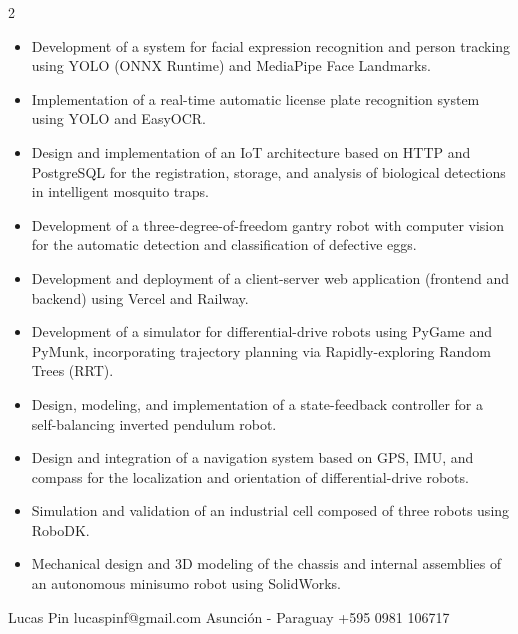 \documentclass[lighthipster]{simplehipstercv}
\newlength{\rightcolwidth}
\begin{document}
\begin{paracol}{2}
\begin{itemize}
\item Development of a system for facial expression recognition and person tracking using YOLO (ONNX Runtime) and MediaPipe Face Landmarks.

\item Implementation of a real-time automatic license plate recognition system using YOLO and EasyOCR.

\item Design and implementation of an IoT architecture based on HTTP and PostgreSQL for the registration, storage, and analysis of biological detections in intelligent mosquito traps.

\item Development of a three-degree-of-freedom gantry robot with computer vision for the automatic detection and classification of defective eggs.

\item Development and deployment of a client-server web application (frontend and backend) using Vercel and Railway.

\item Development of a simulator for differential-drive robots using PyGame and PyMunk, incorporating trajectory planning via Rapidly-exploring Random Trees (RRT).

\item Design, modeling, and implementation of a state-feedback controller for a self-balancing inverted pendulum robot.

\item Design and integration of a navigation system based on GPS, IMU, and compass for the localization and orientation of differential-drive robots.

\item Simulation and validation of an industrial cell composed of three robots using RoboDK.

\item Mechanical design and 3D modeling of the chassis and internal assemblies of an autonomous minisumo robot using SolidWorks.

\end{itemize}

\vfill{} %

\setlength{\parindent}{0pt}
\begin{minipage}[t]{\rightcolwidth}
\begin{center}\fontfamily{\sfdefault}\selectfont \color{black!70}
{\small Lucas Pin  lucaspinf@gmail.com  Asunción - Paraguay  +595 0981 106717  
}
\end{center}
\end{minipage}

\end{paracol}
\end{document}
